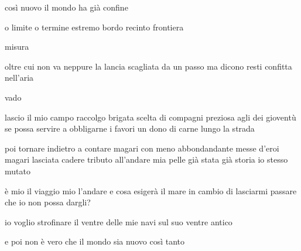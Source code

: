 \begin{poem}
	\begin{stanza}
		così nuovo il mondo\verseline
		ha già confine
	\end{stanza}

	\begin{stanza}
		o limite o termine\verseline
		estremo bordo\verseline
		recinto\verseline
		frontiera
	\end{stanza}

	\begin{stanza}
		misura
	\end{stanza}

	\begin{stanza}
		oltre cui non va\verseline
		neppure la lancia scagliata\verseline
		da un passo\verseline
		ma dicono resti confitta nell’aria
	\end{stanza}

	\begin{stanza}
		vado
	\end{stanza}

	\begin{stanza}
		lascio\verseline
		il mio campo\verseline
		raccolgo brigata scelta di compagni\verseline
		preziosa agli dei gioventù\verseline
		se possa servire a obbligarne i favori\verseline
		un dono di carne lungo la strada
	\end{stanza}

	\begin{stanza}
		poi tornare indietro a contare\verseline
		magari con meno abbondandante\verseline
		messe d’eroi\verseline
		magari lasciata cadere\verseline
		tributo all’andare\verseline
		mia pelle già stata\verseline
		già storia\verseline
		io stesso mutato
	\end{stanza}

	\begin{stanza}
		è mio il viaggio\verseline
		mio l’andare\verseline
		e cosa esigerà il mare\verseline
		in cambio di lasciarmi passare\verseline
		che io non possa dargli?
	\end{stanza}

	\begin{stanza}
		io voglio\verseline
		strofinare il ventre\verseline
		delle mie navi sul suo\verseline
		ventre antico
	\end{stanza}

	\begin{stanza}
		e poi non è vero che il mondo\verseline
		sia nuovo\verseline
		così tanto
	\end{stanza}
\end{poem}

